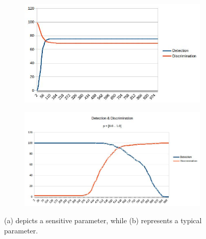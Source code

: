 \documentclass[12pt]{report}
\begin{document}
\begin{figure}
\centering
\begin{subfigure}{.49\linewidth}
 \includegraphics[width=1\linewidth]{figures/sensitive_param.jpg}
  \caption{}
\end{subfigure}
\hfill
\begin{subfigure}{.49\linewidth}
 \includegraphics[width=1\linewidth]{figures/campus_dd.jpg}
  \caption{}
\end{subfigure}

\caption{(a) depicts a sensitive parameter, while (b) represents a typical parameter.}
\label{fig:paramsensitivity}
\end{figure}

\end{document}
